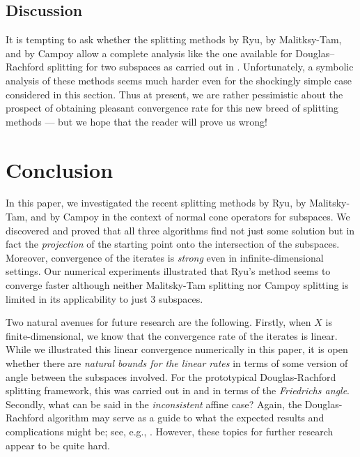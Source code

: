 \documentclass[11pt]{article}
\theoremstyle{definition}
\begin{document}
{{\subsection{Discussion}

It is tempting to ask whether the splitting methods by 
Ryu, by Malitksy-Tam, and by Campoy allow a complete analysis like the one available for Douglas--Rachford splitting for two subspaces as carried out in \cite{BBCNPW1}. 
Unfortunately, a symbolic analysis of
these methods seems much harder even for the shockingly simple case considered in this section. Thus at present, we are rather pessimistic about the prospect of obtaining pleasant convergence rate for this new breed of splitting methods --- but we hope that the reader will prove us wrong!

}

\section{Conclusion}

\label{sec:end}

In this paper, we investigated the recent splitting methods 
by Ryu, by Malitsky-Tam, and by Campoy 
in the context of normal cone operators
for subspaces. We discovered and proved that all three algorithms find not just 
some solution but in fact the \emph{projection} of the starting point onto the
intersection of the subspaces. Moreover, convergence of the iterates 
is \emph{strong} even in infinite-dimensional settings. 
Our numerical experiments illustrated that Ryu's method seems to converge 
faster although neither Malitsky-Tam splitting nor Campoy 
splitting is limited in its applicability to
just 3 subspaces. 

Two natural avenues for future research are the following.
Firstly, when $X$ is finite-dimensional, we know that the convergence
rate of the iterates
is linear. While we illustrated this linear convergence
numerically in this paper, it is open whether there are \emph{natural
bounds for the linear rates} in terms of some version of angle between
the subspaces involved. 
For the prototypical Douglas-Rachford splitting framework, 
this was carried out in  \cite{BBCNPW1} and \cite{BBCNPW2} 
in terms of the \emph{Friedrichs angle}.
Secondly, what can be said in the \emph{inconsistent} affine case?
Again, the Douglas-Rachford algorithm may serve as a guide to what 
the expected results and complications might be; see, e.g., \cite{BM16}. 
{\color{black} However, these topics for further 
research appear to be quite hard.}

}
\end{document}
